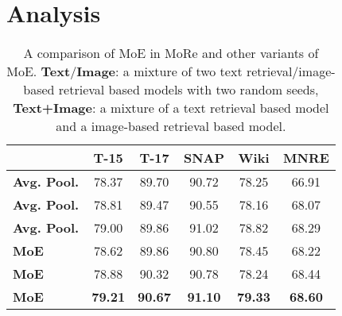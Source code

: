 \documentclass[11pt]{article}
\begin{document}
\section{Analysis}
\begin{table}[t!]
\small
\setlength\tabcolsep{3pt}
\centering
\begin{tabular}{l|ccccc}
\toprule
& T-15 & T-17 & SNAP  & Wiki & MNRE    \\
\midrule
\textbf{Avg. Pool.}       & 78.37     & 89.70     & 90.72 & 78.25      & 66.91 \\
\textbf{Avg. Pool.}      & 78.81     & 89.47     & 90.55 & 78.16      & 68.07 \\
\textbf{Avg. Pool.} & 79.00     & 89.86     & 91.02 & 78.82      & 68.29 \\
\textbf{MoE}        & 78.62     & 89.86     & 90.80 & 78.45      & 68.22 \\
\textbf{MoE}       & 78.88     & 90.32     & 90.78 & 78.24      & 68.44 \\
\textbf{MoE}            & \textbf{79.21}     & \textbf{90.67}     & \textbf{91.10} & \textbf{79.33}      & \textbf{68.60} \\
\bottomrule
\end{tabular}
\caption{A comparison of MoE in MoRe and other variants of MoE. \textbf{Text}/\textbf{Image}: a mixture of two text retrieval/image-based retrieval based models with two random seeds, \textbf{Text+Image}: a mixture of a text retrieval based model and a image-based retrieval based model.}
\label{tab:moe}
\end{table}
\end{document}
